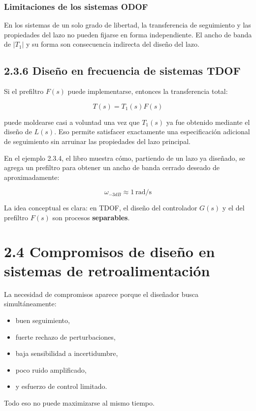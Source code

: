 \subsubsection{Limitaciones de los sistemas ODOF}
En los sistemas de un solo grado de libertad, la transferencia de seguimiento y las propiedades del lazo no pueden fijarse en forma independiente. El ancho de banda de \(|T_1|\) y su forma son consecuencia indirecta del diseño del lazo.

\subsection{2.3.6 Diseño en frecuencia de sistemas TDOF}
Si el prefiltro \(F(s)\) puede implementarse, entonces la transferencia total:

$$
T(s)=T_1(s)F(s)
$$

puede moldearse casi a voluntad una vez que \(T_1(s)\) ya fue obtenido mediante el diseño de \(L(s)\). Eso permite satisfacer exactamente una especificación adicional de seguimiento sin arruinar las propiedades del lazo principal.

En el ejemplo 2.3.4, el libro muestra cómo, partiendo de un lazo ya diseñado, se agrega un prefiltro para obtener un ancho de banda cerrado deseado de aproximadamente:

$$
\omega_{-3dB}\approx 1\ \text{rad/s}
$$

La idea conceptual es clara: en TDOF, el diseño del controlador \(G(s)\) y el del prefiltro \(F(s)\) son procesos \textbf{separables}.



\section{2.4 Compromisos de diseño en sistemas de retroalimentación}
La necesidad de compromisos aparece porque el diseñador busca simultáneamente:

\begin{itemize}
  \item buen seguimiento,
  \item fuerte rechazo de perturbaciones,
  \item baja sensibilidad a incertidumbre,
  \item poco ruido amplificado,
  \item y esfuerzo de control limitado.
\end{itemize}

Todo eso no puede maximizarse al mismo tiempo.

